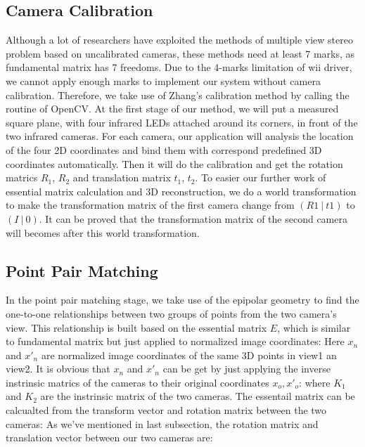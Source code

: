 \documentclass[10pt,twocolumn,letterpaper]{article}
\begin{document}
\subsection{Camera Calibration}
Although a lot of researchers have exploited 
the methods of multiple view stereo problem based
 on uncalibrated cameras, these methods need at
 least 7 marks, as fundamental matrix
 has 7 freedoms. Due to the 4-marks limitation of
 wii driver, we cannot apply enough marks to implement
 our system without camera calibration. Therefore, we
 take use of Zhang's calibration method by calling
 the routine of OpenCV. At the first stage of our
 method, we will put a measured square plane, with
 four infrared LEDs attached around its corners, in
 front of the two infrared cameras. For each camera, our
 application will analysis the location of the four
 2D coordinates and bind them with correspond predefined
 3D coordinates automatically. Then it will do the
 calibration and get the rotation matrics
 $R_{1}$, $R_{2}$ and translation matrix $t_{1}$, $t_{2}$. 
To easier our further work of essential 
matrix calculation and 3D reconstruction, 
we do a world transformation to make the 
transformation matrix of the first camera 
change from $( R1~ | ~t1 )$ to $( I~ | ~0 )$. 
It can be proved that the transformation matrix 
of the second camera will becomes 
\endequation 
after this world transformation. 

\subsection{Point Pair Matching}
In the point pair matching stage, we take use of the 
epipolar geometry to find the one-to-one relationships 
between two groups of points from the two camera's view. 
This relationship is built based on the essential 
matrix $E$, which is similar to fundamental matrix 
but just applied to normalized image coordinates:
 \endequation 
Here $x_{n}$ and $x'_{n}$ are normalized 
image coordinates of the same 3D points in view1 an 
view2. It is obvious that $x_{n}$ and $x'_{n}$ 
can be get by just applying the inverse 
instrinsic matrics of the cameras to their 
original coordinates $x_{o}, x'_{o}$: \endequation 
where $K_{1}$ and $K_{2}$ are the instrinsic 
matrix of the two cameras.
The essentail matrix can be calcualted from the 
transform vector and rotation matrix between 
the two cameras: \endequation
As we've mentioned in last subsection, 
the rotation matrix and translation vector 
between our two cameras are: 
\endequation 
{}\endequation 
\end{document}
